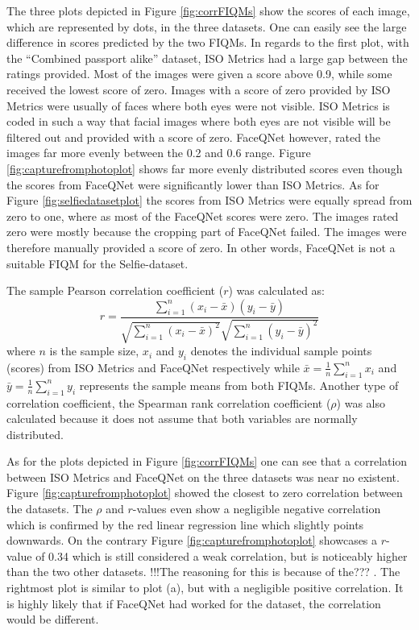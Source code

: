 The three plots depicted in Figure \ref{fig:corrFIQMs} show the scores of each image, which are represented by dots, in the three datasets. One can easily see the large difference in scores predicted by the two FIQMs. In regards to the first plot, with the ``Combined passport alike'' dataset, ISO Metrics had a large gap between the ratings provided. Most of the images were given a score above 0.9, while some received the lowest score of zero. Images with a score of zero provided by ISO Metrics were usually of faces where both eyes were not visible. ISO Metrics is coded in such a way that facial images where both eyes are not visible will be filtered out and provided with a score of zero. FaceQNet however, rated the images far more evenly between the 0.2 and 0.6 range. Figure \ref{fig:capturefromphotoplot} shows far more evenly distributed scores even though the scores from FaceQNet were significantly lower than ISO Metrics. As for Figure \ref{fig:selfiedatasetplot} the scores from ISO Metrics were equally spread from zero to one, where as most of the FaceQNet scores were zero. The images rated zero were mostly because the cropping part of FaceQNet failed. The images were therefore manually provided a score of zero. In other words, FaceQNet is not a suitable FIQM for the Selfie-dataset.  

The sample Pearson correlation coefficient ($r$) was calculated as: 
\begin{equation}
    {\displaystyle r={\frac {\sum _{i=1}^{n}(x_{i}-{\bar {x}})(y_{i}-{\bar {y}})}{{\sqrt {\sum _{i=1}^{n}(x_{i}-{\bar {x}})^{2}}}{\sqrt {\sum _{i=1}^{n}(y_{i}-{\bar {y}})^{2}}}}}}
\end{equation}
where $n$ is the sample size, $x_{i}$ and $y_{i}$ denotes the individual sample points (scores) from ISO Metrics and FaceQNet respectively while ${\bar {x}}={\frac {1}{n}}\sum _{i=1}^{n}x_{i}$ and ${\bar {y}}={\frac {1}{n}}\sum _{i=1}^{n}y_{i}$ represents the sample means from both FIQMs. Another type of correlation coefficient, the Spearman rank correlation coefficient ($\rho$) \cite{wiki:spearman} was also calculated because it does not assume that both variables are normally distributed.

As for the plots depicted in Figure \ref{fig:corrFIQMs} one can see that a correlation between ISO Metrics and FaceQNet on the three datasets was near no existent. Figure \ref{fig:capturefromphotoplot} showed the closest to zero correlation between the datasets. The $\rho$ and $r$-values even show a negligible negative correlation which is confirmed by the red linear regression line which slightly points downwards. On the contrary Figure \ref{fig:capturefromphotoplot} showcases a $r$-value of 0.34 which is still considered a weak correlation, but is noticeably higher than the two other datasets. !!!The reasoning for this is because of the??? . The rightmost plot is similar to plot (a), but with a negligible positive correlation. It is highly likely that if FaceQNet had worked for the dataset, the correlation would be different. 


